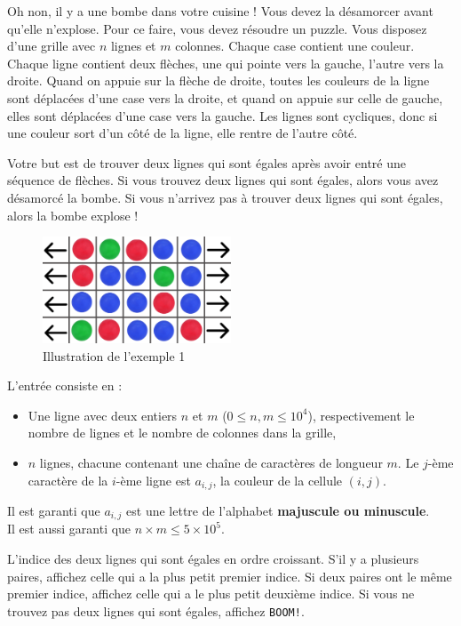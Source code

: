 \problemname{\problemyamlname}


Oh non, il y a une bombe dans votre cuisine ! Vous devez la désamorcer avant qu'elle n'explose. Pour ce faire, vous devez résoudre un puzzle.
Vous disposez d'une grille avec $n$ lignes et $m$ colonnes. Chaque case contient une couleur. Chaque ligne contient deux flèches, une qui pointe vers la gauche, l'autre vers la droite.
Quand on appuie sur la flèche de droite, toutes les couleurs de la ligne sont déplacées d'une case vers la droite, et quand on appuie sur celle de gauche, elles sont déplacées d'une case vers la gauche.
Les lignes sont cycliques, donc si une couleur sort d'un côté de la ligne, elle rentre de l'autre côté.

Votre but est de trouver deux lignes qui sont égales après avoir entré une séquence de flèches. Si vous trouvez deux lignes qui sont égales, alors vous avez désamorcé la bombe. Si vous n'arrivez pas à trouver deux lignes qui sont égales, alors la bombe explose !

\begin{figure}[H]
    \centering
    \includegraphics[width=0.5\textwidth]{illustration.png}
    \caption{Illustration de l'exemple 1}
\end{figure}

\begin{Input}
    L'entrée consiste en :
    \begin{itemize}
        \item Une ligne avec deux entiers $n$ et $m$ ($0\leq n,m \leq 10^4$), respectivement le nombre de lignes et le nombre de colonnes dans la grille,
        \item $n$ lignes, chacune contenant une chaîne de caractères de longueur $m$. Le $j$-ème caractère de la $i$-ème ligne est $a_{i,j}$, la couleur de la cellule $(i,j)$.
    \end{itemize}
    Il est garanti que $a_{i,j}$ est une lettre de l'alphabet \textbf{majuscule ou minuscule}.\\
    Il est aussi garanti que $n \times m \leq 5 \times 10^5$.
\end{Input}

\begin{Output}
    L'indice des deux lignes qui sont égales en ordre croissant. S'il y a plusieurs paires, affichez celle qui a la plus petit premier indice. Si deux paires ont le même premier indice, affichez celle qui a le plus petit deuxième indice. Si vous ne trouvez pas deux lignes qui sont égales, affichez \texttt{BOOM!}.
\end{Output}
